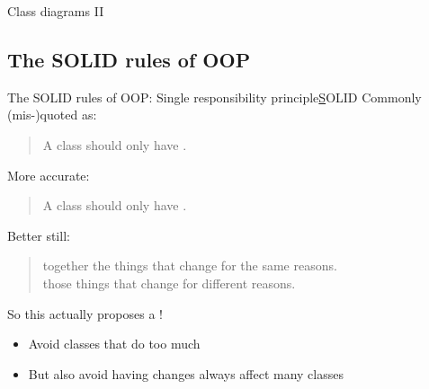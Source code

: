 \begin{frame}{Class diagrams II}
	
\end{frame}


\subsection{The SOLID rules of OOP}

%	

\begin{frame}{The SOLID rules of OOP: Single responsibility principle}{\underline SOLID}
	Commonly (mis-)quoted as:
	
	\begin{quote}
		A class should only have .
	\end{quote}

	More accurate:
	
	\begin{quote}
		A class should only have .
	\end{quote}

	Better still:
	\begin{quote}
		 together the things that change for the same reasons. \\
		 those things that change for different reasons.
	\end{quote}

	So this actually proposes a !
	\begin{itemize}
		\item Avoid classes that do too much 
		\item But also avoid having changes always affect many classes 
	\end{itemize}
\end{frame}


